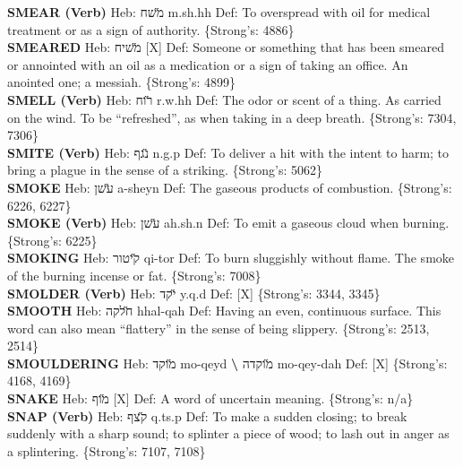 {\textbf{SMEAR (Verb)} Heb: {\large\H משח} m.sh.hh Def: To overspread with oil for medical treatment or as a sign of authority. \{Strong's: 4886\}\hfill{}\\

\textbf{SMEARED} Heb: {\large\H משיח} {[}X{]} Def: Someone or something that has been smeared or annointed with an oil as a medication or a sign of taking an office. An anointed one; a messiah. \{Strong's: 4899\}\hfill{}\\

\textbf{SMELL (Verb)} Heb: {\large\H רוח} r.w.hh Def: The odor or scent of a thing. As carried on the wind. To be ``refreshed'', as when taking in a deep breath. \{Strong's: 7304, 7306\}\hfill{}\\

\textbf{SMITE (Verb)} Heb: {\large\H נגף} n.g.p Def: To deliver a hit with the intent to harm; to bring a plague in the sense of a striking. \{Strong's: 5062\}\hfill{}\\

\textbf{SMOKE} Heb: {\large\H עשן} a-sheyn Def: The gaseous products of combustion. \{Strong's: 6226, 6227\}\hfill{}\\

\textbf{SMOKE (Verb)} Heb: {\large\H עשן} ah.sh.n Def: To emit a gaseous cloud when burning. \{Strong's: 6225\}\hfill{}\\

\textbf{SMOKING} Heb: {\large\H קיטור} qi-tor Def: To burn sluggishly without flame. The smoke of the burning incense or fat. \{Strong's: 7008\}\hfill{}\\

\textbf{SMOLDER (Verb)} Heb: {\large\H יקד} y.q.d Def: {[}X{]} \{Strong's: 3344, 3345\}\hfill{}\\

\textbf{SMOOTH} Heb: {\large\H חלקה} hhal-qah Def: Having an even, continuous surface. This word can also mean ``flattery'' in the sense of being slippery. \{Strong's: 2513, 2514\}\hfill{}\\

\textbf{SMOULDERING} Heb: {\large\H מוקד} mo-qeyd \textbf{\textbackslash{}} {\large\H מוקדה} mo-qey-dah Def: {[}X{]} \{Strong's: 4168, 4169\}\hfill{}\\

\textbf{SNAKE} Heb: {\large\H מוף} {[}X{]} Def: A word of uncertain meaning. \{Strong's: n/a\}\hfill{}\\

\textbf{SNAP (Verb)} Heb: {\large\H קצף} q.ts.p Def: To make a sudden closing; to break suddenly with a sharp sound; to splinter a piece of wood; to lash out in anger as a splintering. \{Strong's: 7107, 7108\}\hfill{}\\

}
